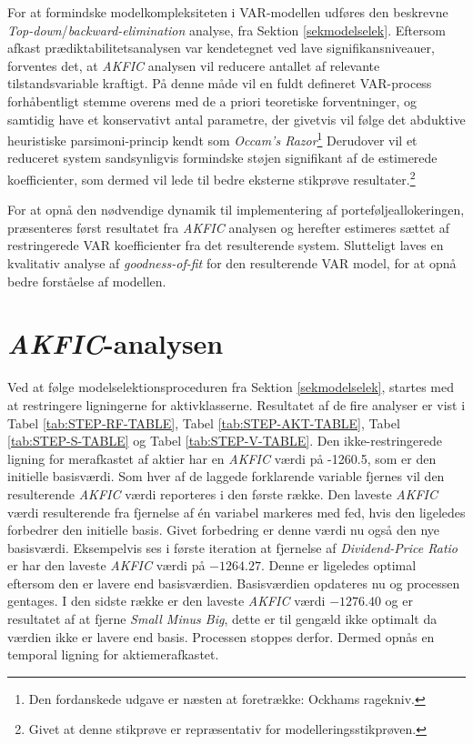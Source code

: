 \documentclass[
  a4paper,
  oneside]{memoir}
\begin{document}
For at formindske modelkompleksiteten i VAR-modellen udføres den beskrevne \emph{Top-down}/\emph{backward-elimination} analyse, fra Sektion \ref{sekmodelselek}. Eftersom afkast prædiktabilitetsanalysen var kendetegnet ved lave signifikansniveauer, forventes det, at \emph{AKFIC} analysen vil reducere antallet af relevante tilstandsvariable kraftigt. På denne måde vil en fuldt defineret VAR-process forhåbentligt stemme overens med de a priori teoretiske forventninger, og samtidig have et konservativt antal parametre, der givetvis vil følge det abduktive heuristiske parsimoni-princip kendt som \emph{Occam's Razor}\footnote{Den fordanskede udgave er næsten at foretrække: Ockhams ragekniv.} Derudover vil et reduceret system sandsynligvis formindske støjen signifikant af de estimerede koefficienter, som dermed vil lede til bedre eksterne stikprøve resultater.\footnote{Givet at denne stikprøve er repræsentativ for modelleringsstikprøven.}

For at opnå den nødvendige dynamik til implementering af porteføljeallokeringen, præsenteres først resultatet fra \emph{AKFIC} analysen og herefter estimeres sættet af restringerede VAR koefficienter fra det resulterende system. Slutteligt laves en kvalitativ analyse af \emph{goodness-of-fit} for den resulterende VAR model, for at opnå bedre forståelse af modellen.

\hypertarget{akficana}{%
\section{\texorpdfstring{\emph{AKFIC}-analysen}{AKFIC-analysen}}\label{akficana}}

Ved at følge modelselektionsproceduren fra Sektion \ref{sekmodelselek}, startes med at restringere ligningerne for aktivklasserne. Resultatet af de fire analyser er vist i Tabel \ref{tab:STEP-RF-TABLE}, Tabel \ref{tab:STEP-AKT-TABLE}, Tabel \ref{tab:STEP-S-TABLE} og Tabel \ref{tab:STEP-V-TABLE}. Den ikke-restringerede ligning for merafkastet af aktier har en \emph{AKFIC} værdi på -1260.5, som er den initielle basisværdi. Som hver af de laggede forklarende variable fjernes vil den resulterende \emph{AKFIC} værdi reporteres i den første række. Den laveste \emph{AKFIC} værdi resulterende fra fjernelse af én variabel markeres med fed, hvis den ligeledes forbedrer den initielle basis. Givet forbedring er denne værdi nu også den nye basisværdi. Eksempelvis ses i første iteration at fjernelse af \emph{Dividend-Price Ratio} er har den laveste \emph{AKFIC} værdi på \(-1264.27\). Denne er ligeledes optimal eftersom den er lavere end basisværdien. Basisværdien opdateres nu og processen gentages. I den sidste række er den laveste \emph{AKFIC} værdi \(-1276.40\) og er resultatet af at fjerne \emph{Small Minus Big}, dette er til gengæld ikke optimalt da værdien ikke er lavere end basis. Processen stoppes derfor. Dermed opnås en temporal ligning for aktiemerafkastet.
\end{document}
